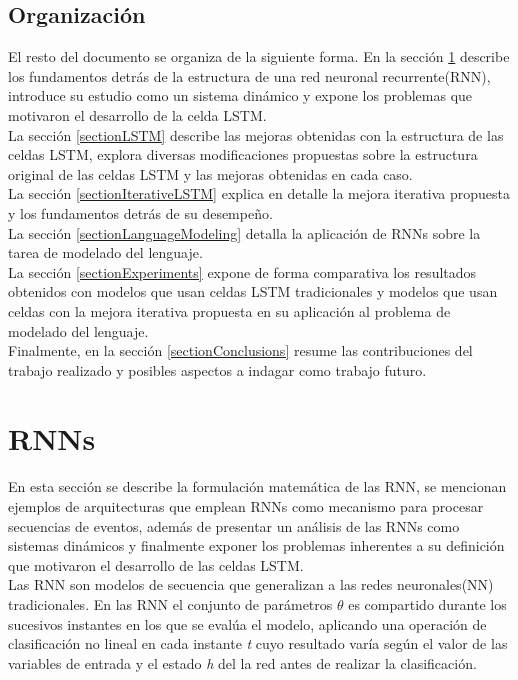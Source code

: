 \documentclass{article}
\begin{document}
	\subsection{Organización}
	El resto del documento se organiza de la siguiente forma. 
	En la sección \ref{sectionRNN} describe los fundamentos detrás de la estructura de una red neuronal recurrente(RNN), introduce su estudio como un sistema dinámico y expone los problemas que motivaron el desarrollo de la celda LSTM. \\
	La sección \ref{sectionLSTM} describe las mejoras obtenidas con la estructura de las celdas LSTM, explora diversas modificaciones propuestas sobre la estructura original de las celdas LSTM y las mejoras obtenidas en cada caso. \\
	La sección \ref{sectionIterativeLSTM} explica en detalle la mejora iterativa propuesta y los fundamentos detrás de su desempeño.\\
	La sección \ref{sectionLanguageModeling} detalla la aplicación de RNNs sobre la tarea de modelado del lenguaje.\\
	La sección \ref{sectionExperiments} expone de forma comparativa los resultados obtenidos con modelos que usan celdas LSTM tradicionales y modelos que usan celdas con la mejora iterativa propuesta en su aplicación al problema de modelado del lenguaje. \\
	Finalmente, en la sección \ref{sectionConclusions} resume las contribuciones del trabajo realizado y posibles aspectos a indagar como trabajo futuro.
	
	\section{RNNs}\label{sectionRNN}
	En esta sección se describe la formulación matemática de las RNN, se mencionan ejemplos de arquitecturas que emplean RNNs como mecanismo para procesar secuencias de eventos, además de presentar un análisis de las RNNs como sistemas dinámicos y finalmente exponer los problemas inherentes a su definición que motivaron el desarrollo de las celdas LSTM.\\
	Las RNN son modelos de secuencia que generalizan a las redes neuronales(NN) tradicionales\cite{19IntroductionRNN}. En las RNN el conjunto de parámetros $\theta$ es compartido durante los sucesivos instantes en los que se evalúa el modelo, aplicando una operación de clasificación no lineal en cada instante \textit{t} cuyo resultado varía según el valor de las variables de entrada y el estado \textit{h} del la red antes de realizar la clasificación.\\ 
	
\end{document}
